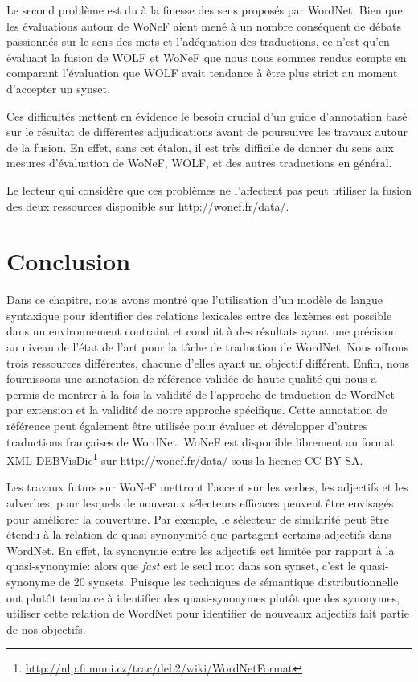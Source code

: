 Le second problème est du à la finesse des sens proposés par WordNet. Bien que
les évaluations autour de WoNeF aient mené à un nombre conséquent de débats
passionnés sur le sens des mots et l'adéquation des traductions, ce n'est qu'en
évaluant la fusion de WOLF et WoNeF que nous nous sommes rendus compte en
comparant l'évaluation que WOLF avait tendance à être plus strict au moment
d'accepter un synset.

Ces difficultés mettent en évidence le besoin crucial d'un guide d'annotation
basé sur le résultat de différentes adjudications avant de poursuivre les
travaux autour de la fusion. En effet, sans cet étalon, il est très difficile
de donner du sens aux mesures d'évaluation de WoNeF, WOLF, et des autres
traductions en général.

Le lecteur qui considère que ces problèmes ne l'affectent pas peut utiliser la
fusion des deux ressources disponible sur \url{http://wonef.fr/data/}.

\section*{Conclusion}

Dans ce chapitre, nous avons montré que l'utilisation d'un modèle de langue
syntaxique pour identifier des relations lexicales entre des lexèmes est
possible dans un environnement contraint et conduit à des résultats ayant une
précision au niveau de l'état de l'art pour la tâche de traduction de WordNet.
Nous offrons trois ressources différentes, chacune d'elles ayant un objectif
différent. Enfin, nous fournissons une annotation de référence validée de haute
qualité qui nous a permis de montrer à la fois la validité de l'approche de
traduction de WordNet par extension et la validité de notre approche
spécifique. Cette annotation de référence peut également être utilisée pour
évaluer et développer d'autres traductions françaises de WordNet. WoNeF est
disponible librement au format XML
DEBVisDic\footnote{\url{http://nlp.fi.muni.cz/trac/deb2/wiki/WordNetFormat}}
sur \url{http://wonef.fr/data/} sous la licence CC-BY-SA.

Les travaux futurs sur WoNeF mettront l'accent sur les verbes, les adjectifs et
les adverbes, pour lesquels de nouveaux sélecteurs efficaces peuvent être
envisagés pour améliorer la couverture. Par exemple, le sélecteur de similarité
peut être étendu à la relation de quasi-synonymité que partagent certains
adjectifs dans WordNet. En effet, la synonymie entre les adjectifs est limitée
par rapport à la quasi-synonymie: alors que \textit{fast} est le seul mot dans
son synset, c'est le quasi-synonyme de 20 synsets. Puisque les techniques de
sémantique distributionnelle ont plutôt tendance à identifier des
quasi-synonymes plutôt que des synonymes, utiliser cette relation de WordNet
pour identifier de nouveaux adjectifs fait partie de nos objectifs.

